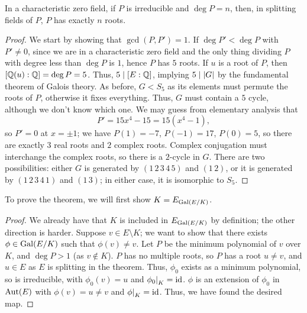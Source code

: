 \begin{lemma}
    In a characteristic zero field, if $P$ is irreducible and $\deg P = n$, then, in splitting fields of $P$, $P$ has exactly $n$ roots.
\end{lemma}
\begin{proof}
    We start by showing that $\gcd(P, P') = 1$. If $\deg P' < \deg P$ with $P' \neq 0$, since we are in a characteristic zero field and the only thing dividing $P$ with degree less than $\deg P$ is $1$, hence $P$ has $5$ roots. If $u$ is a root of $P$, then $[\mathbb Q(u) : \mathbb Q] = \deg P = 5$. Thus, $5 \mid [E : \mathbb Q]$, implying $5 \mid \left\lvert G \right\rvert$ by the fundamental theorem of Galois theory. As before, $G < S_5$ as its elements must permute the roots of $P$, otherwise it fixes everything. Thus, $G$ must contain a $5$ cycle, although we don't know which one. We may guess from elementary analysis that
    \[ P' = 15x^4 - 15 = 15(x^4 - 1), \]
    so $P' = 0$ at $x = \pm 1$; we have $P(1) = -7$, $P(-1) = 17$, $P(0) = 5$, so there are exactly $3$ real roots and $2$ complex roots. Complex conjugation must interchange the complex roots, so there is a $2$-cycle in $G$. There are two possibilities: either $G$ is generated by $(1 \, 2 \, 3 \, 4 \, 5)$ and $(1 \, 2)$, or it is generated by $(1 \, 2 \, 3 \, 4 \, 1)$ and $(1 \, 3)$; in either case, it is isomorphic to $S_5$.
\end{proof}
To prove the theorem, we will first show $K = E_{\operatorname{Gal}(E/K)}$.
\begin{proof}
    We already have that $K$ is included in $E_{\operatorname{Gal}(E/K)}$ by definition; the other direction is harder. Suppose $v \in E \setminus K$; we want to show that there exists $\phi \in \operatorname{Gal}(E/K)$ such that $\phi(v) \neq v$. Let $P$ be the minimum polynomial of $v$ over $K$, and $\deg P > 1$ (as $v \notin K$). $P$ has no multiple roots, so $P$ has a root $u \neq v$, and $u \in E$ as $E$ is splitting in the theorem. Thus, $\phi_0$ exists as a minimum polynomial, so is irreducible, with $\phi_0(v) = u$ and $\restr{\phi_0}{K} = \id$. $\phi$ is an extension of $\phi_0$ in $\operatorname{Aut}(E)$ with $\phi(v) = u \neq v$ and $\restr{\phi}{K} = \id$. Thus, we have found the desired map.
\end{proof}
